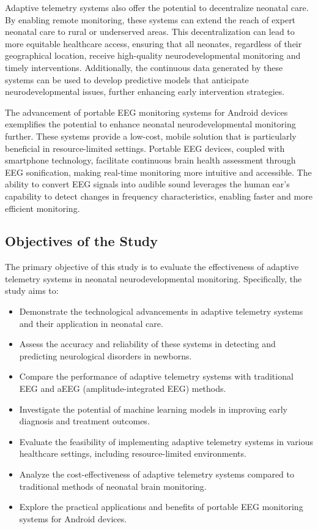 \documentclass[12pt,journal,compsoc]{IEEEtran}
\begin{document}
Adaptive telemetry systems also offer the potential to decentralize neonatal care. By enabling remote monitoring, these systems can extend the reach of expert neonatal care to rural or underserved areas. This decentralization can lead to more equitable healthcare access, ensuring that all neonates, regardless of their geographical location, receive high-quality neurodevelopmental monitoring and timely interventions. Additionally, the continuous data generated by these systems can be used to develop predictive models that anticipate neurodevelopmental issues, further enhancing early intervention strategies.

The advancement of portable EEG monitoring systems for Android devices exemplifies the potential to enhance neonatal neurodevelopmental monitoring further. These systems provide a low-cost, mobile solution that is particularly beneficial in resource-limited settings. Portable EEG devices, coupled with smartphone technology, facilitate continuous brain health assessment through EEG sonification, making real-time monitoring more intuitive and accessible. The ability to convert EEG signals into audible sound leverages the human ear's capability to detect changes in frequency characteristics, enabling faster and more efficient monitoring.

\subsection{Objectives of the Study}
The primary objective of this study is to evaluate the effectiveness of adaptive telemetry systems in neonatal neurodevelopmental monitoring. Specifically, the study aims to:
\begin{itemize}
    \item Demonstrate the technological advancements in adaptive telemetry systems and their application in neonatal care.
    \item Assess the accuracy and reliability of these systems in detecting and predicting neurological disorders in newborns.
    \item Compare the performance of adaptive telemetry systems with traditional EEG and aEEG (amplitude-integrated EEG) methods.
    \item Investigate the potential of machine learning models in improving early diagnosis and treatment outcomes.
    \item Evaluate the feasibility of implementing adaptive telemetry systems in various healthcare settings, including resource-limited environments.
    \item Analyze the cost-effectiveness of adaptive telemetry systems compared to traditional methods of neonatal brain monitoring.
    \item Explore the practical applications and benefits of portable EEG monitoring systems for Android devices.
\end{itemize}
\end{document}
